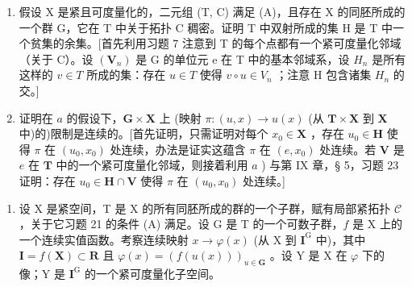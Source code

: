 \begin{enumerate}
\def\labelenumi{\alph{enumi})}
\item
  假设 X 是紧且可度量化的，二元组 (T, C) 满足 (A)，且存在 X 的同胚所成的一个群 G，它在 T 中关于拓扑 C 稠密。证明 T 中双射所成的集 H 是 T 中一个贫集的余集。{[}首先利用习题 7 注意到 T 的每个点都有一个紧可度量化邻域（关于 C）。设 \((\mathbf{V}_{n})\) 是 G 的单位元 e 在 T 中的基本邻域系，设 \(H_{n}\) 是所有这样的 \(v \in T\) 所成的集：存在 \(u \in T\) 使得 \(v \circ u \in V_{n}\) ；注意 H 包含诸集 \(H_{n}\) 的交。{]}
\item
  证明在 \(a\) 的假设下，\(\mathbf{G} \times \mathbf{X}\) 上 (映射 \(\pi: (u, x) \to u(x)\) (从 \(\mathbf{T} \times \mathbf{X}\) 到 \(\mathbf{X}\) 中)的)限制是连续的。{[}首先证明，只需证明对每个 \(x_0 \in \mathbf{X}\) ，存在 \(u_0 \in \mathbf{H}\) 使得 \(\pi\) 在 \((u_0, x_0)\) 处连续，办法是证实这蕴含 \(\pi\) 在 \((e, x_0)\) 处连续。若 \(\mathbf{V}\) 是 \(e\) 在 \(\mathbf{T}\) 中的一个紧可度量化邻域，则接着利用 \(a\) ) 与第 IX 章，§ 5，习题 23 证明：存在 \(u_0 \in \mathbf{H} \cap \mathbf{V}\) 使得 \(\pi\) 在 \((u_0, x_0)\) 处连续。{]}
\end{enumerate}

\begin{enumerate}
\def\labelenumi{\arabic{enumi})}
\setcounter{enumi}{21}
\tightlist
\item
  设 X 是紧空间，T 是 X 的所有同胚所成的群的一个子群，赋有局部紧拓扑 \(\mathcal{C}\) ，关于它习题 21 的条件 (A) 满足。设 G 是 T 的一个可数子群，\(f\) 是 X 上的一个连续实值函数。考察连续映射 \(x \to \varphi(x)\) (从 X 到 \(\mathbf{I}^{\mathrm{G}}\) 中)，其中 \(\mathbf{I} = f(\mathbf{X}) \subset \mathbf{R}\) 且 \(\varphi(x) = (f(u(x)))_{u \in \mathbf{G}}\) 。设 Y 是 X 在 \(\varphi\) 下的像；Y 是 \(\mathbf{I}^{\mathrm{G}}\) 的一个紧可度量化子空间。
\end{enumerate}

